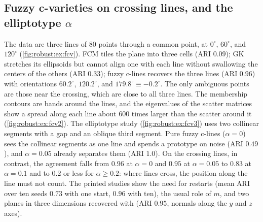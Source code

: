 \subsection{Fuzzy c-varieties on crossing lines, and the elliptotype \texorpdfstring{$\alpha$}{alpha}}\label{sec:robust:ex:fcv}

The data are three lines of 80 points through a common point, at $0^\circ$, $60^\circ$, and $120^\circ$ (\cref{fig:robust:ex:fcv}). FCM tiles the plane into three cells (ARI $0.09$); GK stretches its ellipsoids but cannot align one with each line without swallowing the centers of the others (ARI $0.33$); fuzzy c-lines recovers the three lines (ARI $0.96$) with orientations $60.2^\circ$, $120.2^\circ$, and $179.8^\circ\equiv-0.2^\circ$. The only ambiguous points are those near the crossing, which are close to all three lines. The membership contours are bands around the lines, and the eigenvalues of the scatter matrices show a spread along each line about 600 times larger than the scatter around it (\cref{fig:robust:ex:fcv2}). The elliptotype study (\cref{fig:robust:ex:fcv3}) uses two collinear segments with a gap and an oblique third segment. Pure fuzzy c-lines ($\alpha=0$) sees the collinear segments as one line and spends a prototype on noise (ARI $0.49$), and $\alpha=0.05$ already separates them (ARI $1.0$). On the crossing lines, in contrast, the agreement falls from $0.96$ at $\alpha=0$ and $0.95$ at $\alpha=0.05$ to $0.83$ at $\alpha=0.1$ and to $0.2$ or less for $\alpha\ge0.2$: where lines cross, the position along the line must not count. The printed studies show the need for restarts (mean ARI over ten seeds $0.73$ with one start, $0.96$ with ten), the usual role of $m$, and two planes in three dimensions recovered with  (ARI $0.95$, normals along the $y$ and $z$ axes).


